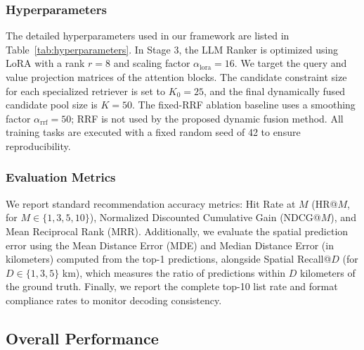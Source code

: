 \documentclass[journal]{IEEEtran}
\begin{document}
\subsubsection{Hyperparameters}
The detailed hyperparameters used in our framework are listed in Table~\ref{tab:hyperparameters}. In Stage 3, the LLM Ranker is optimized using LoRA with a rank $r=8$ and scaling factor $\alpha_{\mathrm{lora}}=16$. We target the query and value projection matrices of the attention blocks. The candidate constraint size for each specialized retriever is set to $K_0 = 25$, and the final dynamically fused candidate pool size is $K = 50$. The fixed-RRF ablation baseline uses a smoothing factor $\alpha_{\mathrm{rrf}} = 50$; RRF is not used by the proposed dynamic fusion method. All training tasks are executed with a fixed random seed of 42 to ensure reproducibility.

\subsubsection{Evaluation Metrics}
We report standard recommendation accuracy metrics: Hit Rate at $M$ (HR@$M$, for $M \in \{1, 3, 5, 10\}$), Normalized Discounted Cumulative Gain (NDCG@$M$), and Mean Reciprocal Rank (MRR). Additionally, we evaluate the spatial prediction error using the Mean Distance Error (MDE) and Median Distance Error (in kilometers) computed from the top-1 predictions, alongside Spatial Recall@$D$ (for $D \in \{1, 3, 5\}$ km), which measures the ratio of predictions within $D$ kilometers of the ground truth. Finally, we report the complete top-10 list rate and format compliance rates to monitor decoding consistency.

\subsection{Overall Performance}
\end{document}
